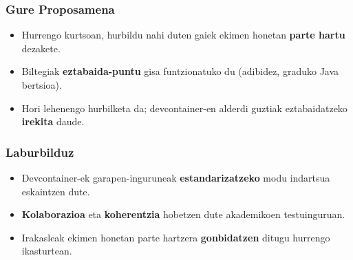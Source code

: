 \documentclass[lang=eu,biz=pls,aspectratio=169,handout]{mupresentation}
\begin{document}
\begin{frame}
  \frametitle{Gure Proposamena}
  \begin{itemize}
    \item Hurrengo kurtsoan, hurbildu nahi duten gaiek ekimen honetan \textbf{parte hartu} dezakete.
    \item Biltegiak \textbf{eztabaida-puntu} gisa funtzionatuko du (adibidez, graduko Java bertsioa).
    \item Hori lehenengo hurbilketa da; devcontainer-en alderdi guztiak eztabaidatzeko \textbf{irekita} daude.
  \end{itemize}
\end{frame}

\begin{frame}
  \frametitle{Laburbilduz}
  \begin{itemize}
    \item Devcontainer-ek garapen-inguruneak \textbf{estandarizatzeko} modu indartsua eskaintzen dute.
    \item \textbf{Kolaborazioa} eta \textbf{koherentzia} hobetzen dute akademikoen testuinguruan.
    \item Irakasleak ekimen honetan parte hartzera \textbf{gonbidatzen} ditugu hurrengo ikasturtean.
  \end{itemize}
\end{frame}

\end{document}
